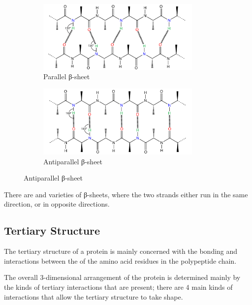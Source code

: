 				\begin{figure}
				\begin{center}
					\begin{subfigure}{.5\textwidth}
						\centering
						\includegraphics[width=80mm]{../figures/organic/ch18/parallel_beta_sheet.png}
						\caption*{Parallel β-sheet}
					\end{subfigure}%
					\begin{subfigure}{.5\textwidth}
						\centering
						\includegraphics[width=80mm]{../figures/organic/ch18/antiparallel_beta_sheet.png}
						\caption*{Antiparallel β-sheet}
					\end{subfigure}
				\end{center}
				\end{figure}

				There are  and  varieties of β-sheets, where the two strands either run in the same direction,
				or in opposite directions.




		\subsection{Tertiary Structure}

			The tertiary structure of a protein is mainly concerned with the bonding and interactions between the  of the
			amino acid residues in the polypeptide chain.

			The overall 3-dimensional arrangement of the protein is determined mainly by the kinds of tertiary interactions that are
			present; there are 4 main kinds of interactions that allow the tertiary structure to take shape.


